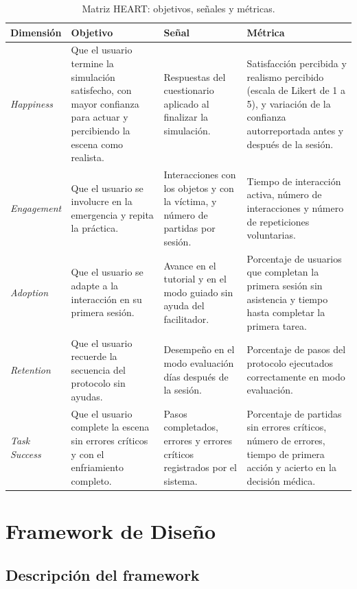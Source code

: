 \documentclass[11pt,letterpaper]{article}
\begin{document}
\begin{table}[H]
\centering
\small
\begin{tabular}{L{2cm} L{3.6cm} L{3.6cm} L{3.8cm}}
\toprule
\textbf{Dimensión} & \textbf{Objetivo} & \textbf{Señal} & \textbf{Métrica} \\
\midrule
\textit{Happiness} & Que el usuario termine la simulación satisfecho, con mayor confianza para actuar y percibiendo la escena como realista. & Respuestas del cuestionario aplicado al finalizar la simulación. & Satisfacción percibida y realismo percibido (escala de Likert de 1 a 5), y variación de la confianza autorreportada antes y después de la sesión. \\
\addlinespace
\textit{Engagement} & Que el usuario se involucre en la emergencia y repita la práctica. & Interacciones con los objetos y con la víctima, y número de partidas por sesión. & Tiempo de interacción activa, número de interacciones y número de repeticiones voluntarias. \\
\addlinespace
\textit{Adoption} & Que el usuario se adapte a la interacción en su primera sesión. & Avance en el tutorial y en el modo guiado sin ayuda del facilitador. & Porcentaje de usuarios que completan la primera sesión sin asistencia y tiempo hasta completar la primera tarea. \\
\addlinespace
\textit{Retention} & Que el usuario recuerde la secuencia del protocolo sin ayudas. & Desempeño en el modo evaluación días después de la sesión. & Porcentaje de pasos del protocolo ejecutados correctamente en modo evaluación. \\
\addlinespace
\textit{Task Success} & Que el usuario complete la escena sin errores críticos y con el enfriamiento completo. & Pasos completados, errores y errores críticos registrados por el sistema. & Porcentaje de partidas sin errores críticos, número de errores, tiempo de primera acción y acierto en la decisión médica. \\
\bottomrule
\end{tabular}
\caption{Matriz HEART: objetivos, señales y métricas.}
\label{tab:heart}
\end{table}

\section{Framework de Diseño}

\subsection{Descripción del framework}
\end{document}
